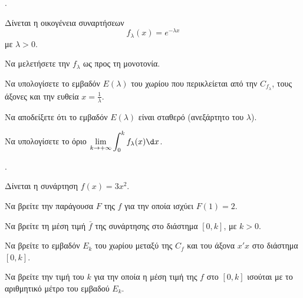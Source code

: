 \documentclass[11pt,a4paper,twocolumn]{article}
\newcounter{askhsh}
\newcommand{\askhsh}{\large\theaskhsh.\ \addtocounter{askhsh}{1}}
\begin{document}
\askhsh Δίνεται η οικογένεια συναρτήσεων \[f_\lambda(x) = e^{-\lambda x}\] με $\lambda > 0$.
\begin{alist}
\item Να μελετήσετε την $f_\lambda$ ως προς τη μονοτονία.
\item Να υπολογίσετε το εμβαδόν $E(\lambda)$ του χωρίου που περικλείεται από την $C_{f_\lambda}$, τους άξονες και την ευθεία $x=\frac{1}{\lambda}$.
\item Να αποδείξετε ότι το εμβαδόν $E(\lambda)$ είναι σταθερό (ανεξάρτητο του $\lambda$).
\item Να υπολογίσετε το όριο $\displaystyle\lim_{k \to +\infty} \int_0^k f_\lambda(x) \d x$.
\end{alist}

\askhsh Δίνεται η συνάρτηση $f(x)=3x^2$.
\begin{alist}
\item Να βρείτε την παράγουσα $F$ της $f$ για την οποία ισχύει $F(1)=2$.
\item Να βρείτε τη μέση τιμή $\bar{f}$ της συνάρτησης στο διάστημα $[0, k]$, με $k>0$.
\item Να βρείτε το εμβαδόν $E_k$ του χωρίου μεταξύ της $C_f$ και του άξονα $x'x$ στο διάστημα $[0, k]$.
\item Να βρείτε την τιμή του $k$ για την οποία η μέση τιμή της $f$ στο $[0, k]$ ισούται με το αριθμητικό μέτρο του εμβαδού $E_k$.
\end{alist}
\end{document}
